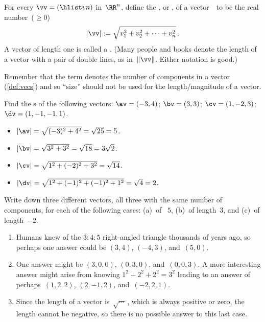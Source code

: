 \begin{definition}[Pythagoras] \label{def:veclen}
For every  \(\vv=(\hlist vn)\) in~\(\RR^n\),
define the , or , of a vector~\vv\  to be the real number~(\(\geq0\))
\begin{equation*}
|\vv|:=\sqrt{v_1^2+v_2^2+\cdots+v_n^2}\,.
\end{equation*}
A vector of length one is called a .
(Many people and books denote the length of a vector with a pair of double lines, as in~\(\|\vv\|\).  Either notation is good.)
\end{definition}

Remember that the term  denotes the number of components in a vector (\cref{def:vecs}) and so ``size'' should not be used for the length\slash magnitude of a vector.


\begin{example} 
Find the s of the following vectors:
\(\av=(-3,4)\); \(\bv=(3,3)\); \(\cv=(1,-2,3)\); \(\dv=(1,-1,-1,1)\).
\begin{solution} 
\begin{itemize}
\item \(|\av|=\sqrt{(-3)^2+4^2}=\sqrt{25}=5\). 
\item \(|\bv|=\sqrt{3^2+3^2}=\sqrt{18}=3\sqrt2\). 
\item \(|\cv|=\sqrt{1^2+(-2)^2+3^2}=\sqrt{14}\). 
\item \(|\dv|=\sqrt{1^2+(-1)^2+(-1)^2+1^2}=\sqrt4=2\).
\aqed
\end{itemize}
\end{solution}
\end{example}

\begin{example} 
Write down three different vectors, all three with the same number of components, for each of the following cases: (a)~of ~\(5\), (b)~of length~\(3\), and (c)~of length~\(-2\).
\begin{solution} 
\begin{enumerate}
\item Humans knew of the \(3:4:5\) right-angled triangle thousands of years ago, so perhaps one answer could be \((3,4)\), \((-4,3)\), and~\((5,0)\).
\item One answer might be \((3,0,0)\), \((0,3,0)\), and~\((0,0,3)\). 
A more interesting answer might arise from knowing \(1^2+2^2+2^2=3^2\) leading to an answer of perhaps~\((1,2,2)\), \((2,-1,2)\), and~\((-2,2,1)\).
\item Since the length of a vector is~\(\sqrt{\cdots}\)\,, which is always positive or zero, the length cannot be negative, so there is no possible answer to this last case.
\aqed
\end{enumerate}
\end{solution}
\end{example}




